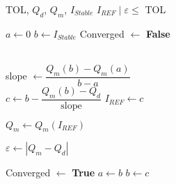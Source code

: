 \begin{algorithmic}[1]

\Require TOL, $Q_{d}$, $Q_{m}$, $I_{Stable}$
\Ensure $I_{REF} \; | \; \varepsilon \leq$ TOL

\State $a \gets 0$
\State $b \gets I_{Stable}$
\State Converged $\gets$ \textbf{False}

 \\

    \State slope $ \gets \dfrac{Q_m(b) - Q_m(a)}{b-a}$  \\
    \State $c \gets b - \dfrac{Q_m(b) - Q_d}{\text{slope}}$
    \State $I_{REF} \gets c$

    \State $Q_{m} \gets Q_{m}\left(I_{REF}\right)$  

    \State $\varepsilon \gets \left|Q_m - Q_d \right|$

     Converged $\gets$ \textbf{True} 
        \Else
            \State $a \gets b$
            \State $b \gets c$
    \EndIf

\EndWhile
\end{algorithmic}